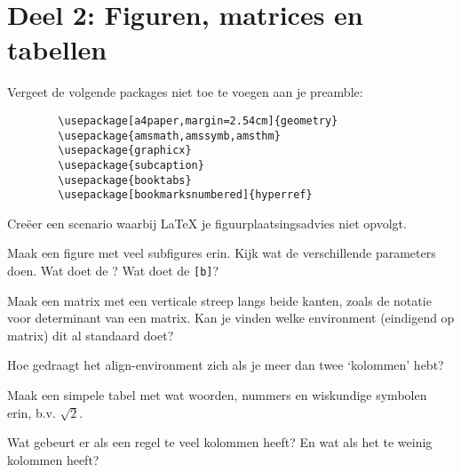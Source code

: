 \documentclass[a4paper]{article}
\begin{document}
    \section{Deel 2: Figuren, matrices en tabellen}

    Vergeet de volgende packages niet toe te voegen aan je preamble:
    \begin{verbatim}
        \usepackage[a4paper,margin=2.54cm]{geometry}
        \usepackage{amsmath,amssymb,amsthm}
        \usepackage{graphicx}
        \usepackage{subcaption}
        \usepackage{booktabs}
        \usepackage[bookmarksnumbered]{hyperref}
    \end{verbatim}
    \bigskip


    \begin{exercise}[Figuurplaatsing]
        Cre\"eer een scenario waarbij \LaTeX{} je figuurplaatsingsadvies niet opvolgt.
    \end{exercise}

    \begin{exercise}[Subfigure]
        Maak een figure met veel subfigures erin. Kijk wat de verschillende parameters
        doen. Wat doet de \texttt{\textwidth}? Wat doet de \texttt{[b]}?
    \end{exercise}

    \begin{exercise}[Matrix]
        Maak een matrix met een verticale streep langs beide kanten, zoals de
        notatie voor determinant van een matrix. Kan je vinden welke environment (eindigend op
        matrix) dit al standaard doet?
    \end{exercise}

    \begin{exercise}[Align]
        Hoe gedraagt het align-environment zich als je meer dan twee `kolommen' hebt?
    \end{exercise}

    \begin{exercise}
        Maak een simpele tabel met wat woorden, nummers en wiskundige symbolen erin, b.v. $ \sqrt{2} $.
    \end{exercise}

    \begin{exercise}[Kolomscheidingen]
        Wat gebeurt er als een regel te veel kolommen heeft? En wat als het te
        weinig kolommen heeft?
    \end{exercise}
\end{document}
